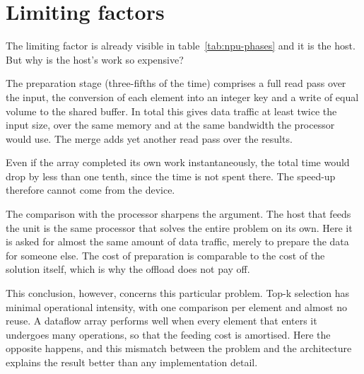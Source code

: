 \section{Limiting factors}
\label{sec:npu-bottlenecks}

The limiting factor is already visible in table~\ref{tab:npu-phases} and it is
the host. But why is the host's work so expensive?

The preparation stage (three-fifths of the time) comprises a full read pass
over the input, the conversion of each element into an integer key and a write
of equal volume to the shared buffer. In total this gives data traffic at least
twice the input size, over the same memory and at the same bandwidth the
processor would use. The merge adds yet another read pass over the results.

Even if the array completed its own work instantaneously, the total time would
drop by less than one tenth, since the time is not spent there. The speed-up
therefore cannot come from the device.

The comparison with the processor sharpens the argument. The host that feeds
the unit is the same processor that solves the entire problem on its own. Here
it is asked for almost the same amount of data traffic, merely to prepare the
data for someone else. The cost of preparation is comparable to the cost of the
solution itself, which is why the offload does not pay off.

This conclusion, however, concerns this particular problem. Top-k selection has
minimal operational intensity, with one comparison per element and almost no
reuse. A dataflow array performs well when every element that enters it
undergoes many operations, so that the feeding cost is amortised. Here the
opposite happens, and this mismatch between the problem and the architecture
explains the result better than any implementation detail.
